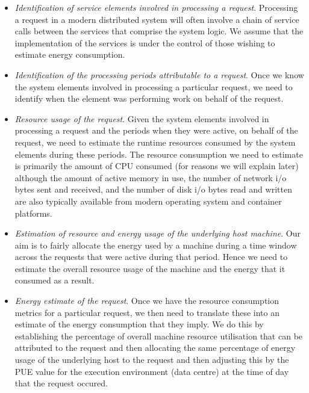\begin{itemize}

\item \emph{Identification of service elements involved in processing a request}.  Processing a request in a modern distributed system will often involve a chain of service calls between the services that comprise the system logic.  We assume that the implementation of the services is under the control of those wishing to estimate energy consumption.

\item \emph{Identification of the processing periods attributable to a request}.  Once we know the system elements involved in processing a particular request, we need to identify when the element was performing work on behalf of the request.

\item \emph{Resource usage of the request}.  Given the system elements involved in processing a request and the periods when they were active, on behalf of the request, we need to estimate the runtime resources consumed by the system elements during these periods.  The resource consumption we need to estimate is primarily the amount of CPU consumed (for reasons we will explain later) although the amount of active memory in use, the number of network i/o bytes sent and received, and the number of disk i/o bytes read and written are also typically available from modern operating system and container platforms.

\item \emph{Estimation of resource and energy usage of the underlying host machine}.  Our aim is to fairly allocate the energy used by a machine during a time window across the requests that were active during that period.  Hence we need to estimate the overall resource usage of the machine and the energy that it consumed as a result.

\item \emph{Energy estimate of the request}.  Once we have the resource consumption metrics for a particular request, we then need to translate these into an estimate of the energy consumption that they imply.  We do this by establishing the percentage of overall machine resource utilisation that can be attributed to the request and then allocating the same percentage of energy usage of the underlying host to the request and then adjusting this by the PUE value for the execution environment (data centre) at the time of day that the request occured.

\end{itemize}

